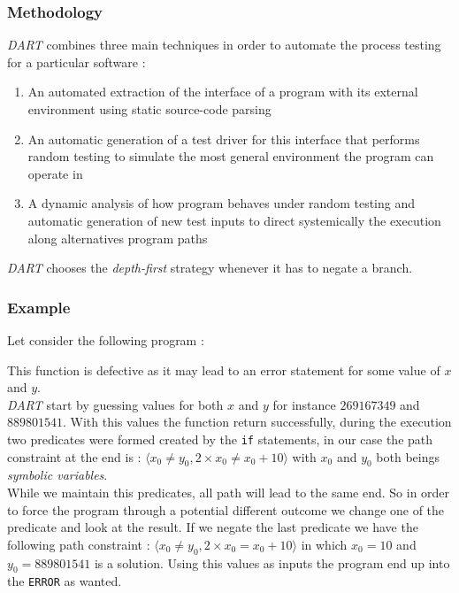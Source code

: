 \documentclass[11pt]{article}
\begin{document}
    	\subsubsection{Methodology}
	    	\emph{DART} combines three main techniques 	    	\cite{godefroid2005dart} in order to automate the process testing for a particular software :
	    	\begin{enumerate}
	    		\item An automated extraction of the interface of a program with its external environment using static source-code parsing
	    		\item An automatic generation of a test driver for this interface that performs random testing to simulate the most general environment the program can operate in
	    		\item A dynamic analysis of how program behaves under random testing and automatic generation of new test inputs to direct systemically the execution along alternatives program paths
	    	\end{enumerate}
	    		    	
			\emph{DART} chooses the \emph{depth-first} strategy whenever it has to negate a branch.
	    
	    \subsubsection{Example}	
		    Let consider the following program :
		     
		    \begin{algorithm}
		    	
		    	
		    \end{algorithm}
	    	
	    	This function is defective as it may lead to an error statement for some value of $x$ and $y$.\\
	    	\emph{DART} start by guessing values for both $x$ and $y$ for instance $269167349$ and $889801541$. With this values the function return  successfully, during the execution two predicates were formed created by the \texttt{if} statements, in our case the path constraint at the end is : $\langle x_0 \neq y_0, 2 \times x_0 \neq x_0 + 10 \rangle$ with $x_0$ and $y_0$ both beings \emph{symbolic variables}.\\ %
	    	While we maintain this predicates, all path will lead to the same end. So in order to force  the program through a potential different outcome we change one of the predicate and look at the result. If we negate the last predicate we have the following path constraint : $\langle x_0 \neq y_0, 2 \times x_0 = x_0 + 10 \rangle$ in which $x_0=10$ and $y_0=889801541$ is a solution. Using this values as inputs the program end up into the \texttt{ERROR} as wanted.
\end{document}

